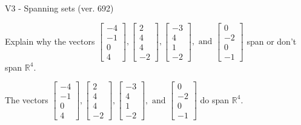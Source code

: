 \begin{exercise}
  \begin{exerciseTitle}V3 - Spanning sets (ver. 692)\end{exerciseTitle}
  \begin{exerciseStatement}
    Explain why the vectors \(\left[\begin{array}{r}
-4 \\
-1 \\
0 \\
4
\end{array}\right] , \left[\begin{array}{r}
2 \\
4 \\
4 \\
-2
\end{array}\right] , \left[\begin{array}{r}
-3 \\
4 \\
1 \\
-2
\end{array}\right] , \text{ and } \left[\begin{array}{r}
0 \\
-2 \\
0 \\
-1
\end{array}\right]\) span or don't span \(\mathbb{R}^4\). 
	


  \end{exerciseStatement}
  \begin{exerciseAnswer}
   The vectors \(\left[\begin{array}{r}
-4 \\
-1 \\
0 \\
4
\end{array}\right] , \left[\begin{array}{r}
2 \\
4 \\
4 \\
-2
\end{array}\right] , \left[\begin{array}{r}
-3 \\
4 \\
1 \\
-2
\end{array}\right] , \text{ and } \left[\begin{array}{r}
0 \\
-2 \\
0 \\
-1
\end{array}\right]\) 
  	 do  
	span \(\mathbb{R}^4\).
  


  \end{exerciseAnswer}
\end{exercise}